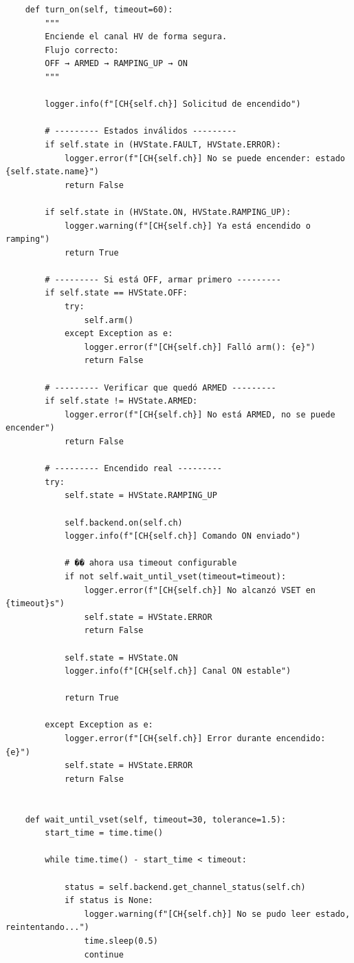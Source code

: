 \documentclass{article}
\begin{document}
\begin{lstlisting}
    def turn_on(self, timeout=60):
        """
        Enciende el canal HV de forma segura.
        Flujo correcto:
        OFF → ARMED → RAMPING_UP → ON
        """

        logger.info(f"[CH{self.ch}] Solicitud de encendido")

        # --------- Estados inválidos ---------
        if self.state in (HVState.FAULT, HVState.ERROR):
            logger.error(f"[CH{self.ch}] No se puede encender: estado {self.state.name}")
            return False

        if self.state in (HVState.ON, HVState.RAMPING_UP):
            logger.warning(f"[CH{self.ch}] Ya está encendido o ramping")
            return True

        # --------- Si está OFF, armar primero ---------
        if self.state == HVState.OFF:
            try:
                self.arm()
            except Exception as e:
                logger.error(f"[CH{self.ch}] Falló arm(): {e}")
                return False

        # --------- Verificar que quedó ARMED ---------
        if self.state != HVState.ARMED:
            logger.error(f"[CH{self.ch}] No está ARMED, no se puede encender")
            return False

        # --------- Encendido real ---------
        try:
            self.state = HVState.RAMPING_UP

            self.backend.on(self.ch)
            logger.info(f"[CH{self.ch}] Comando ON enviado")

            # �� ahora usa timeout configurable
            if not self.wait_until_vset(timeout=timeout):
                logger.error(f"[CH{self.ch}] No alcanzó VSET en {timeout}s")
                self.state = HVState.ERROR
                return False

            self.state = HVState.ON
            logger.info(f"[CH{self.ch}] Canal ON estable")

            return True

        except Exception as e:
            logger.error(f"[CH{self.ch}] Error durante encendido: {e}")
            self.state = HVState.ERROR
            return False


    def wait_until_vset(self, timeout=30, tolerance=1.5):
        start_time = time.time()

        while time.time() - start_time < timeout:

            status = self.backend.get_channel_status(self.ch)
            if status is None:
                logger.warning(f"[CH{self.ch}] No se pudo leer estado, reintentando...")
                time.sleep(0.5)
                continue


\end{lstlisting}
\end{document}
